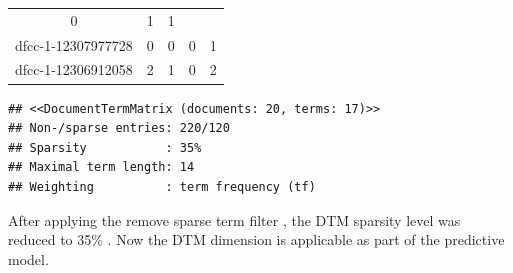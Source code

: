 \documentclass[]{article}
\begin{document}
\begin{longtable}[c]{@{}ccccc@{}}
\begin{minipage}[t]{0.12\columnwidth}\centering\strut
0
\strut\end{minipage} &
\begin{minipage}[t]{0.11\columnwidth}\centering\strut
1
\strut\end{minipage} &
\begin{minipage}[t]{0.06\columnwidth}\centering\strut
1
\strut\end{minipage}\tabularnewline
\begin{minipage}[t]{0.23\columnwidth}\centering\strut
dfcc-1-12307977728
\strut\end{minipage} &
\begin{minipage}[t]{0.10\columnwidth}\centering\strut
0
\strut\end{minipage} &
\begin{minipage}[t]{0.12\columnwidth}\centering\strut
0
\strut\end{minipage} &
\begin{minipage}[t]{0.11\columnwidth}\centering\strut
0
\strut\end{minipage} &
\begin{minipage}[t]{0.06\columnwidth}\centering\strut
1
\strut\end{minipage}\tabularnewline
\begin{minipage}[t]{0.23\columnwidth}\centering\strut
dfcc-1-12306912058
\strut\end{minipage} &
\begin{minipage}[t]{0.10\columnwidth}\centering\strut
2
\strut\end{minipage} &
\begin{minipage}[t]{0.12\columnwidth}\centering\strut
1
\strut\end{minipage} &
\begin{minipage}[t]{0.11\columnwidth}\centering\strut
0
\strut\end{minipage} &
\begin{minipage}[t]{0.06\columnwidth}\centering\strut
2
\strut\end{minipage}\tabularnewline
\bottomrule
\end{longtable}

\begin{verbatim}
## <<DocumentTermMatrix (documents: 20, terms: 17)>>
## Non-/sparse entries: 220/120
## Sparsity           : 35%
## Maximal term length: 14
## Weighting          : term frequency (tf)
\end{verbatim}

After applying the remove sparse term filter , the DTM sparsity level
was reduced to 35\% . Now the DTM dimension is applicable as part of the
predictive model.
\end{document}
